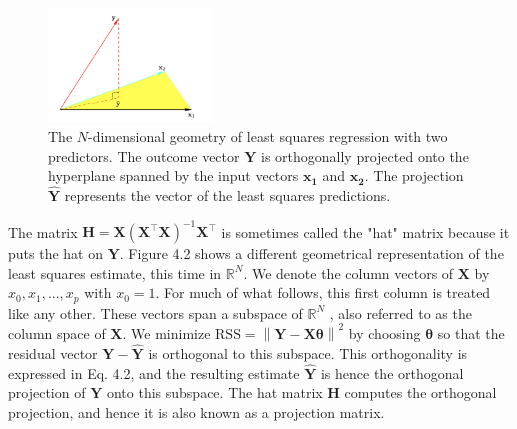 \documentclass[twoside]{article}
\newcommand{\norm}[1]{\left\lVert #1 \right\rVert}
\begin{document}
\begin{figure}[ht]
\caption{The $N$-dimensional geometry of least squares regression with two predictors. The outcome vector $\boldsymbol{Y}$ is orthogonally projected onto the hyperplane spanned by the input vectors $\boldsymbol{x_1}$ and $\boldsymbol{x_2}$. The projection $\hat{\boldsymbol{Y}}$ represents the vector of the least squares predictions.}
\centering
\includegraphics[width=0.39\textwidth]{img/geo_ls.png}
\end{figure}
\newpage
The matrix $\boldsymbol{H} = \boldsymbol{X}(\boldsymbol{X}^{\intercal}\boldsymbol{X})^{-1}\boldsymbol{X}^{\intercal}$ is sometimes called the "hat" matrix because it puts the hat on $\boldsymbol{Y}$.
Figure 4.2 shows a different geometrical representation of the least squares estimate, this time in $\mathbb{R}^N$.
We denote the column vectors of $\boldsymbol{X}$ by $x_0, x_1, . . . , x_p$ with $x_0 = 1$. For much of what follows, this first column is treated like any other. These vectors span a subspace of $\mathbb{R}^N$ , also referred to as the column space of $\boldsymbol{X}$. We minimize $\text{RSS} =  \norm{\boldsymbol{Y} - \boldsymbol{X\theta}}^2$ by choosing $\boldsymbol{\theta}$ so that the residual vector $\boldsymbol{Y} - \boldsymbol{\hat{Y}}$ is orthogonal to this subspace. This orthogonality is expressed in Eq. 4.2, and the resulting estimate $\boldsymbol{\hat{Y}}$ is hence the orthogonal projection of  $\boldsymbol{Y}$ onto this subspace. The hat matrix $\boldsymbol{H}$ computes the orthogonal projection, and hence it is also known as a projection matrix.
\end{document}
